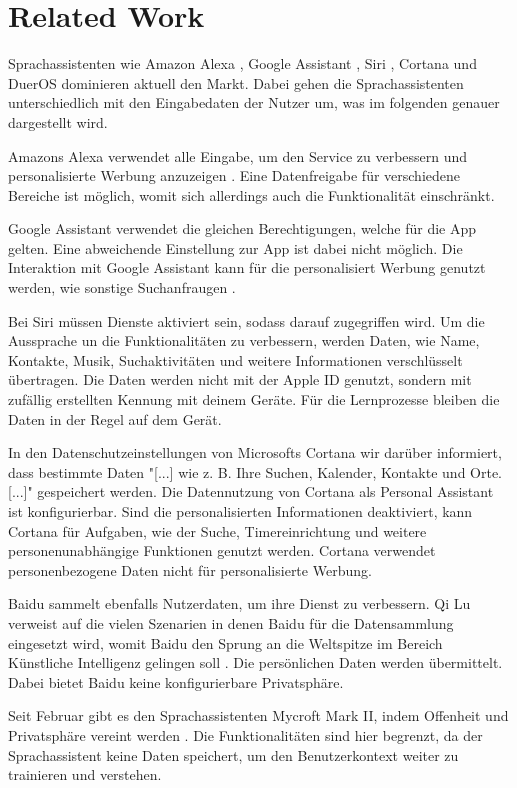 \section{Related Work}
Sprachassistenten wie Amazon Alexa \cite{alexaAssitent}, Google Assistant \cite{googleAssistant}, Siri \cite{siriAssistent}, Cortana \cite{cortanaAssistent} und DuerOS \cite{baiduAssistant} dominieren aktuell den Markt. Dabei gehen die Sprachassistenten unterschiedlich mit den Eingabedaten der Nutzer um, was im folgenden genauer dargestellt wird. 

Amazons Alexa verwendet alle Eingabe, um den Service zu verbessern und personalisierte Werbung anzuzeigen \cite{alexaPrivacy}. Eine Datenfreigabe für verschiedene Bereiche ist möglich, womit sich allerdings auch die Funktionalität einschränkt. 

Google Assistant verwendet die gleichen Berechtigungen, welche für die App gelten\cite{googleShare}. Eine abweichende Einstellung zur App ist dabei nicht möglich. Die Interaktion mit Google Assistant kann für die personalisiert Werbung genutzt werden, wie sonstige Suchanfraugen \cite{googlePrivacy}. 

Bei Siri müssen Dienste aktiviert sein, sodass darauf zugegriffen wird\cite{siriPrivacy}. Um die Aussprache un die Funktionalitäten zu verbessern, werden Daten, wie Name, Kontakte, Musik, Suchaktivitäten und weitere Informationen verschlüsselt übertragen. Die Daten werden nicht mit der Apple ID genutzt, sondern mit zufällig erstellten Kennung mit deinem Geräte. Für die Lernprozesse bleiben die Daten in der Regel auf dem Gerät.

In den Datenschutzeinstellungen von Microsofts Cortana wir darüber informiert, dass bestimmte Daten "[...] wie z. B. Ihre Suchen, Kalender, Kontakte und Orte. [...]" \cite{cortanaAssistent} gespeichert werden. Die Datennutzung von Cortana als Personal Assistant ist konfigurierbar. Sind die personalisierten Informationen deaktiviert, kann Cortana für Aufgaben, wie der Suche, Timereinrichtung und weitere personenunabhängige Funktionen genutzt werden. Cortana verwendet personenbezogene Daten nicht für personalisierte Werbung.  

Baidu sammelt ebenfalls Nutzerdaten, um ihre Dienst zu verbessern. Qi Lu verweist auf die vielen Szenarien in denen Baidu für die Datensammlung eingesetzt wird, womit Baidu den Sprung an die Weltspitze im Bereich Künstliche Intelligenz gelingen soll \cite{baiduAI}. Die persönlichen Daten werden übermittelt. Dabei bietet Baidu keine konfigurierbare Privatsphäre.

Seit Februar gibt es den Sprachassistenten Mycroft Mark II, indem Offenheit und Privatsphäre vereint werden \cite{mycroftsmartspeaker}. Die Funktionalitäten sind hier begrenzt, da der Sprachassistent keine Daten speichert, um den Benutzerkontext weiter zu trainieren und verstehen.